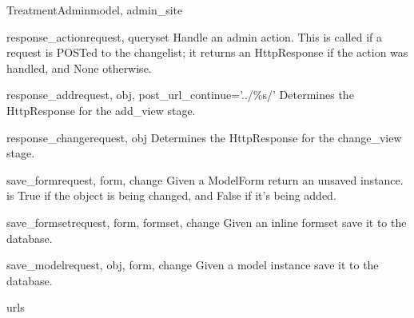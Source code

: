 \documentclass[letterpaper,10pt,english]{sphinxmanual}
\begin{document}
\begin{classdesc}{TreatmentAdmin}{model, admin\_site}
\hypertarget{data.admin.TreatmentAdmin.response_action}{}\begin{methoddesc}{response\_action}{request, queryset}
Handle an admin action. This is called if a request is POSTed to the
changelist; it returns an HttpResponse if the action was handled, and
None otherwise.
\end{methoddesc}

\hypertarget{data.admin.TreatmentAdmin.response_add}{}\begin{methoddesc}{response\_add}{request, obj, post\_url\_continue='../\%s/'}
Determines the HttpResponse for the add\_view stage.
\end{methoddesc}

\hypertarget{data.admin.TreatmentAdmin.response_change}{}\begin{methoddesc}{response\_change}{request, obj}
Determines the HttpResponse for the change\_view stage.
\end{methoddesc}

\hypertarget{data.admin.TreatmentAdmin.save_form}{}\begin{methoddesc}{save\_form}{request, form, change}
Given a ModelForm return an unsaved instance.  is True if
the object is being changed, and False if it's being added.
\end{methoddesc}

\hypertarget{data.admin.TreatmentAdmin.save_formset}{}\begin{methoddesc}{save\_formset}{request, form, formset, change}
Given an inline formset save it to the database.
\end{methoddesc}

\hypertarget{data.admin.TreatmentAdmin.save_model}{}\begin{methoddesc}{save\_model}{request, obj, form, change}
Given a model instance save it to the database.
\end{methoddesc}

\hypertarget{data.admin.TreatmentAdmin.urls}{}\begin{memberdesc}{urls}\end{memberdesc}
\end{classdesc}
\end{document}
